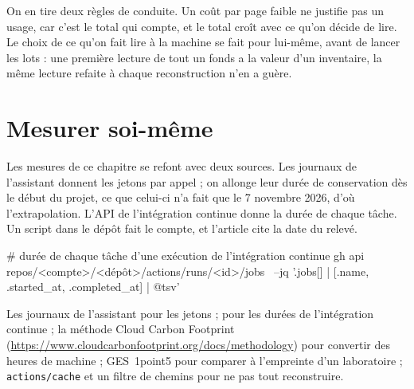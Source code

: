 On en tire deux règles de conduite. Un coût par page faible ne justifie pas un usage, car
c'est le total qui compte, et le total croît avec ce qu'on décide de lire. Le choix de ce
qu'on fait lire à la machine se fait pour lui-même, avant de lancer les lots : une première
lecture de tout un fonds a la valeur d'un inventaire, la même lecture refaite à chaque
reconstruction n'en a guère.

\section{Mesurer soi-même}

Les mesures de ce chapitre se refont avec deux sources. Les journaux de l'assistant donnent
les jetons par appel ; on allonge leur durée de conservation dès le début du projet, ce
que celui-ci n'a fait que le 7 novembre 2026, d'où l'extrapolation. L'API de l'intégration
continue donne la durée de chaque tâche. Un script dans le dépôt fait le compte, et
l'article cite la date du relevé.

\begin{terminal}
# durée de chaque tâche d'une exécution de l'intégration continue
gh api repos/<compte>/<dépôt>/actions/runs/<id>/jobs \
  --jq '.jobs[] | [.name, .started_at, .completed_at] | @tsv'
\end{terminal}

\begin{outils}
Les journaux de l'assistant pour les jetons ;  pour les durées de
l'intégration continue ; la méthode Cloud Carbon Footprint
(\url{https://www.cloudcarbonfootprint.org/docs/methodology}) pour convertir des heures de
machine ; GES~1point5 pour comparer à l'empreinte d'un laboratoire ; \texttt{actions/cache}
et un filtre de chemins pour ne pas tout reconstruire.
\end{outils}
